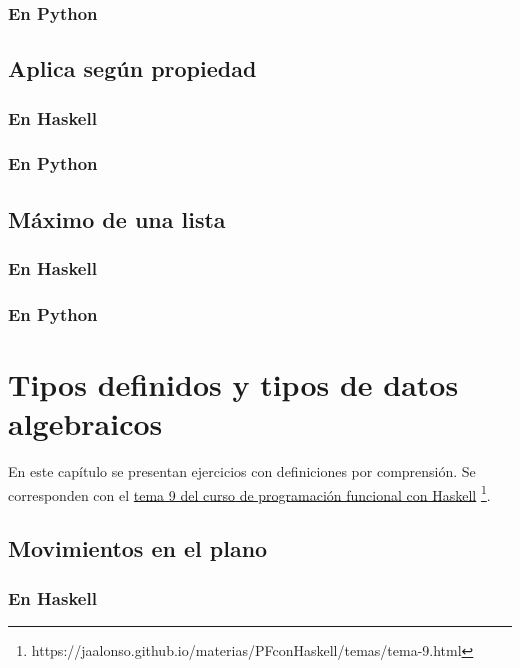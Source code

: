 \documentclass[a4paper,12pt,twoside]{book}
\begin{document}
\subsection*{En Python}

\section{Aplica según propiedad}
\subsection*{En Haskell}
\subsection*{En Python}

\section{Máximo de una lista}
\subsection*{En Haskell}
\subsection*{En Python}

\chapter{Tipos definidos y tipos de datos algebraicos}

En este capítulo se presentan ejercicios con definiciones por
comprensión. Se corresponden con el
\href{https://jaalonso.github.io/materias/PFconHaskell/temas/tema-9.html}
{tema 9 del curso de programación funcional con Haskell}
\footnote{https://jaalonso.github.io/materias/PFconHaskell/temas/tema-9.html}.

\minitoc

\section{Movimientos en el plano}
\subsection*{En Haskell}
\end{document}
